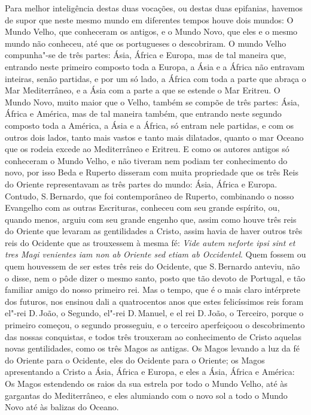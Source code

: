 Para melhor inteligência destas duas vocações, ou destas duas epifanias,
havemos de supor que neste mesmo mundo em diferentes tempos houve dois
mundos: O Mundo Velho, que conheceram os antigos, e o Mundo Novo, que
eles e o mesmo mundo não conheceu, até que os portugueses o descobriram.
O mundo Velho compunha"-se de três partes: Ásia, África e Europa, mas de
tal maneira que, entrando neste primeiro composto toda a Europa, a Ásia
e a África não entravam inteiras, senão partidas, e por um só lado, a
África com toda a parte que abraça o Mar Mediterrâneo, e a Ásia com a
parte a que se estende o Mar Eritreu. O Mundo Novo, muito maior que o
Velho, também se compõe de três partes: Ásia, África e América, mas de
tal maneira também, que entrando neste segundo composto toda a América,
a Ásia e a África, só entram nele partidas, e com os outros dois lados,
tanto mais vastos e tanto mais dilatados, quanto o mar Oceano que os
rodeia excede ao Mediterrâneo e Eritreu. E como os autores antigos só
conheceram o Mundo Velho, e não tiveram nem podiam ter conhecimento do
novo, por isso Beda e Ruperto disseram com muita propriedade que os três
Reis do Oriente representavam as três partes do mundo: Ásia, África e
Europa. Contudo, S.\,Bernardo, que foi contemporâneo de Ruperto,
combinando o nosso Evangelho com as outras Escrituras, conheceu com seu
grande espírito, ou, quando menos, arguiu com seu grande engenho que,
assim como houve três reis do Oriente que levaram as gentilidades a
Cristo, assim havia de haver outros três reis do Ocidente que as
trouxessem à mesma fé: \emph{Vide autem neforte ipsi sint et tres Magi
venientes iam non ab Oriente sed etiam ab Occidentel}.
Quem fossem ou quem houvessem de ser estes três reis do Ocidente, que S.\,Bernardo anteviu, não o disse, nem o pôde dizer o mesmo santo, posto que
tão devoto de Portugal, e tão familiar amigo do nosso primeiro rei. Mas
o tempo, que é o mais claro intérprete dos futuros, nos ensinou dali a
quatrocentos anos que estes felicíssimos reis foram el"-rei D.\,João, o
Segundo, el"-rei D.\,Manuel, e el rei D.\,João, o Terceiro, porque o
primeiro começou, o segundo prosseguiu, e o terceiro aperfeiçoou o
descobrimento das nossas conquistas, e todos três trouxeram ao
conhecimento de Cristo aquelas novas gentilidades, como os três Magos as
antigas. Os Magos levando a luz da fé do Oriente para o Ocidente, eles
do Ocidente para o Oriente;
os Magos apresentando a Cristo a Ásia, África e Europa, e eles a Ásia,
África e América: Os Magos estendendo os raios da sua estrela por todo o
Mundo Velho, até às gargantas do Mediterrâneo, e eles alumiando com o
novo sol a todo o Mundo Novo até às balizas do Oceano.

